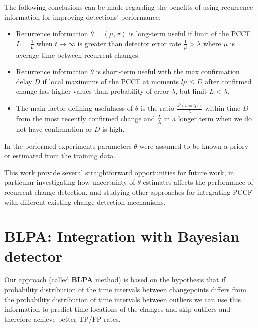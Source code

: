 The following conclusions can be made regarding the benefits of using recurrence information for improving detections' performance:
\begin{itemize}
  \item Recurrence information $\theta=(\mu, \sigma)$ is long-term useful if limit of the PCCF $L = \frac{1}{\mu}$ when $t \to \infty$ is greater than detector error rate $\frac{1}{\mu} > \lambda$ where $\mu$ is average time between recurrent changes.
  \item Recurrence information $\theta$ is short-term useful with the max confirmation delay $D$ if local maximums of the PCCF at moments $l \mu \leq D$ after confirmed change has higher values than probability of error $\lambda$,
      but limit $L < \lambda$.
  \item The main factor defining usefulness of $\theta$ is the ratio $\frac{\mathcal{P}(t = l \mu)}{\lambda}$ within time $D$ from the most recently confirmed change and $\frac{L}{\lambda}$ in a longer term when we do not have confirmation or $D$ is high.
\end{itemize}
In the performed experiments parameters $\theta$ were assumed to be known a priory or estimated from the training data.

This work provide several straightforward opportunities for future work, in particular investigating how uncertainty of $\theta$ estimates affects the performance of recurrent change detection, and studying other approaches for integrating PCCF with different existing change detection mechanisms.

\section{BLPA: Integration with Bayesian detector}

Our approach (called \textbf{BLPA} method) is based on the hypothesis that if probability distribution of the time intervals between changepoints differs from the probability distribution of time intervals between outliers we can use this information to predict time locations of the changes and skip outliers and therefore achieve better TP/FP rates.

